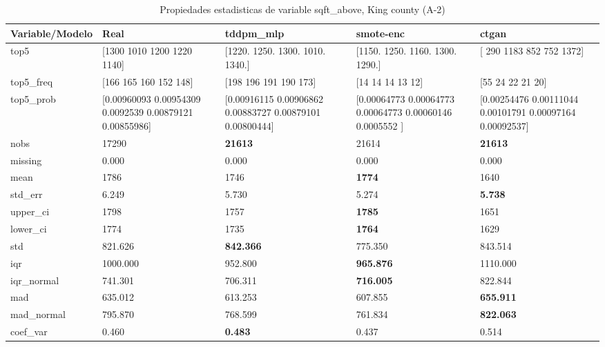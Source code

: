 \begin{table}[H]
\centering
\fontsize{8}{14}\selectfont
\caption{Propiedades  estadisticas de variable sqft\_above, King county (A-2)}
\label{table-stats-king county-a-2-sqft_above}
\begin{tabular}{|l|m{10em}|m{10em}|m{10em}|m{10em}|}
\hline
 \rowcolor[gray]{0.8}
Variable/Modelo & Real & tddpm\_mlp & smote-enc & ctgan \\
\hline top5 & [1300 1010 1200 1220 1140] & [1220. 1250. 1300. 1010. 1340.] & [1150. 1250. 1160. 1300. 1290.] & [ 290 1183  852  752 1372] \\
\hline top5\_freq & [166 165 160 152 148] & [198 196 191 190 173] & [14 14 14 13 12] & [55 24 22 21 20] \\
\hline top5\_prob & [0.00960093 0.00954309 0.0092539  0.00879121 0.00855986] & [0.00916115 0.00906862 0.00883727 0.00879101 0.00800444] & [0.00064773 0.00064773 0.00064773 0.00060146 0.0005552 ] & [0.00254476 0.00111044 0.00101791 0.00097164 0.00092537] \\
\hline nobs & 17290 & \bfseries 21613 & \cellcolor[rgb]{0.9, 0.54, 0.52} 21614 & \bfseries 21613 \\
\hline missing & 0.000 & 0.000 & 0.000 & 0.000 \\
\hline mean & 1786 & 1746 & \bfseries 1774 & \cellcolor[rgb]{0.9, 0.54, 0.52} 1640 \\
\hline std\_err & 6.249 & 5.730 & \cellcolor[rgb]{0.9, 0.54, 0.52} 5.274 & \bfseries 5.738 \\
\hline upper\_ci & 1798 & 1757 & \bfseries 1785 & \cellcolor[rgb]{0.9, 0.54, 0.52} 1651 \\
\hline lower\_ci & 1774 & 1735 & \bfseries 1764 & \cellcolor[rgb]{0.9, 0.54, 0.52} 1629 \\
\hline std & 821.626 & \bfseries 842.366 & \cellcolor[rgb]{0.9, 0.54, 0.52} 775.350 & 843.514 \\
\hline iqr & 1000.000 & 952.800 & \bfseries 965.876 & \cellcolor[rgb]{0.9, 0.54, 0.52} 1110.000 \\
\hline iqr\_normal & 741.301 & 706.311 & \bfseries 716.005 & \cellcolor[rgb]{0.9, 0.54, 0.52} 822.844 \\
\hline mad & 635.012 & 613.253 & \cellcolor[rgb]{0.9, 0.54, 0.52} 607.855 & \bfseries 655.911 \\
\hline mad\_normal & 795.870 & 768.599 & \cellcolor[rgb]{0.9, 0.54, 0.52} 761.834 & \bfseries 822.063 \\
\hline coef\_var & 0.460 & \bfseries 0.483 & 0.437 & \cellcolor[rgb]{0.9, 0.54, 0.52} 0.514 \\

\end{tabular}
\end{table}
